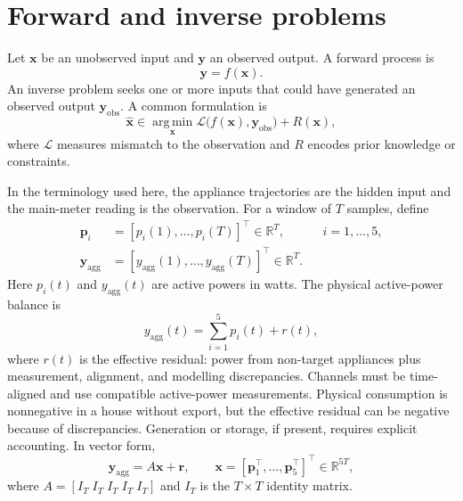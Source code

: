 \documentclass[11pt]{article}
\newcommand{\R}{\mathbb{R}}
\newcommand{\vect}[1]{\mathbf{#1}}
\begin{document}
\section{Forward and inverse problems}

Let $\vect{x}$ be an unobserved input and $\vect{y}$ an observed output. A forward process is
\begin{equation}
    \vect{y}=f(\vect{x}).
    \label{eq:forward_general}
\end{equation}
An inverse problem seeks one or more inputs that could have generated an observed output $\vect{y}_{\mathrm{obs}}$. A common formulation is
\begin{equation}
    \hat{\vect{x}} \in \operatorname*{arg\,min}_{\vect{x}}
    \mathcal{L}\bigl(f(\vect{x}),\vect{y}_{\mathrm{obs}}\bigr)+R(\vect{x}),
    \label{eq:inverse_general}
\end{equation}
where $\mathcal{L}$ measures mismatch to the observation and $R$ encodes prior knowledge or constraints.

In the terminology used here, the appliance trajectories are the hidden input and the main-meter reading is the observation. For a window of $T$ samples, define
\begin{align}
    \vect{p}_i &= [p_i(1),\ldots,p_i(T)]^{\top}\in\R^T, &&i=1,\ldots,5,\\
    \vect{y}_{\mathrm{agg}}&=[y_{\mathrm{agg}}(1),\ldots,y_{\mathrm{agg}}(T)]^{\top}\in\R^T.
\end{align}
Here $p_i(t)$ and $y_{\mathrm{agg}}(t)$ are active powers in watts. The physical active-power balance is
\begin{equation}
    y_{\mathrm{agg}}(t)=\sum_{i=1}^{5}p_i(t)+r(t),
    \label{eq:power_balance_scalar}
\end{equation}
where $r(t)$ is the effective residual: power from non-target appliances plus measurement, alignment, and modelling discrepancies. Channels must be time-aligned and use compatible active-power measurements. Physical consumption is nonnegative in a house without export, but the effective residual can be negative because of discrepancies. Generation or storage, if present, requires explicit accounting. In vector form,
\begin{equation}
    \vect{y}_{\mathrm{agg}}=A\vect{x}+\vect{r},\qquad
    \vect{x}=[\vect{p}_1^{\top},\ldots,\vect{p}_5^{\top}]^{\top}\in\R^{5T},
    \label{eq:power_balance_vector}
\end{equation}
where $A=[I_T\;I_T\;I_T\;I_T\;I_T]$ and $I_T$ is the $T\times T$ identity matrix.
\end{document}

